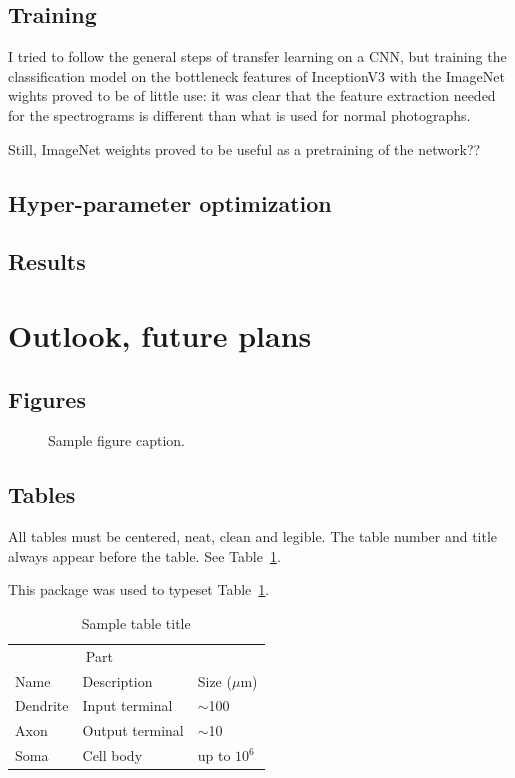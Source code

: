 \documentclass{article}
\begin{document}
\subsection{Training}
I tried to follow the general steps of transfer learning on a CNN, but training the classification model on the bottleneck features of InceptionV3 with the ImageNet wights proved to be of little use: it was clear that the feature extraction needed for the spectrograms is different than what is used for normal photographs.

Still, ImageNet weights proved to be useful as a pretraining of the network??

\subsection{Hyper-parameter optimization}

\subsection{Results}

\section{Outlook, future plans}

\subsection{Figures}

\begin{figure}[ht]
  \centering
  \fbox{\rule[-.5cm]{0cm}{4cm} \rule[-.5cm]{4cm}{0cm}}
  \caption{Sample figure caption.}
\end{figure}

\subsection{Tables}

All tables must be centered, neat, clean and legible.  The table number and
title always appear before the table.  See Table~\ref{sample-table}.

This package was used to typeset Table~\ref{sample-table}.

\begin{table}[ht]
  \caption{Sample table title}
  \label{sample-table}
  \centering
  \begin{tabular}{lll}
    \toprule
    \multicolumn{2}{c}{Part}                   \\
    \cmidrule(r){1-2}
    Name     & Description     & Size ($\mu$m) \\
    \midrule
    Dendrite & Input terminal  & $\sim$100     \\
    Axon     & Output terminal & $\sim$10      \\
    Soma     & Cell body       & up to $10^6$  \\
    \bottomrule
  \end{tabular}
\end{table}
\end{document}
